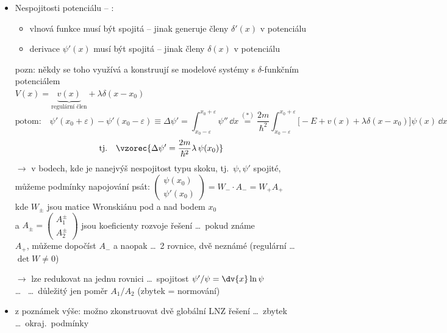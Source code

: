 \begin{itemize}
  \item Nespojitosti potenciálu -- :
  \begin{itemize}[nosep]
    \item[$\to$] vlnová funkce musí být spojitá -- jinak generuje členy $\delta'(x)$ v potenciálu
    \item[$\to$] derivace $\psi'(x)$ musí být spojitá -- jinak členy $\delta(x)$ v potenciálu
  \end{itemize}
  pozn: někdy se toho využívá a konstruují se modelové systémy s $\delta$-funkčním potenciálem \\
  \quad $V(x) = \underbrace{v(x)}_{\text{regulární člen}} + \lambda\delta(x - x_0)$
  \[
    \text{potom:}\quad \psi'(x_0+\varepsilon) - \psi'(x_0-\varepsilon) \equiv \Delta\psi' = \int_{x_0-\varepsilon}^{x_0+\varepsilon}\psi''\,\dd x
    \overset{(*)}{=} \frac{2m}{\hbar^2}\int_{x_0-\varepsilon}^{x_0+\varepsilon}\big[-E + v(x) + \lambda\delta(x - x_0)\big]\psi(x)\,\dd x
  \]
  \[ \text{tj.}\quad \vzorec{\Delta\psi' = \frac{2m}{\hbar^2}\lambda\,\psi(x_0)} \]
  $\to$ v bodech, kde je nanejvýš nespojitost typu skoku, tj.\ $\psi,\psi'$ spojité, \\
  můžeme podmínky napojování psát: \quad
  $\begin{pmatrix}\psi(x_0)\\ \psi'(x_0)\end{pmatrix} = W_-\cdot A_- = W_+A_+$ \\
  kde $W_\pm$ jsou matice Wronskiánu pod a nad bodem $x_0$ \\
  a $A_\pm = \begin{pmatrix}A_1^\pm\\ A_2^\pm\end{pmatrix}$ jsou koeficienty rozvoje řešení \dots\ pokud známe \\
  $A_+$, můžeme dopočíst $A_-$ a naopak \dots\ 2 rovnice, dvě neznámé (regulární \dots\ $\det W\neq0$)

  $\to$ lze redukovat na jednu rovnici \dots\ spojitost $\psi'/\psi = \dv{x}\ln\psi$ \\
  \dots\  \quad \dots\ důležitý jen poměr $A_1/A_2$ \quad (zbytek = normování)
  \item z poznámek výše: možno zkonstruovat dvě globální LNZ řešení \dots\ zbytek \dots\ okraj.\ podmínky
\end{itemize}


